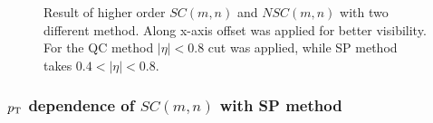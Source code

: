 	\begin{figure}[h]
		\begin{center}
        \caption{Result of higher order $SC(m,n)$ and $NSC(m,n)$ with two different method. Along x-axis offset was applied for better visibility. For the QC method $|\eta| < 0.8$ cut was applied, while SP method takes $0.4 < |\eta| <0.8$.}
        \label{SC_higherorder_comparison}
        \end{center}   
     \end{figure}
     
     
\subsubsection{$p_{\rm{T}}$ dependence of $SC(m,n)$ with SP method}


